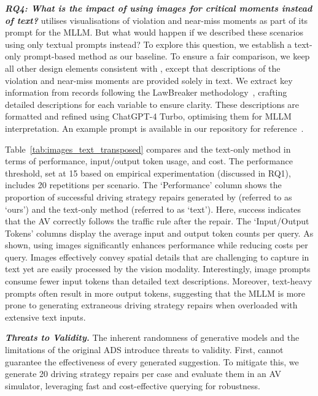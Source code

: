 \noindent \emph{\textbf {RQ4: What is the impact of using images for critical moments instead of text?}}
\coolname utilises visualisations of violation and near-miss moments as part of its prompt for the MLLM. 
But what would happen if we described these scenarios using only textual prompts instead? To explore this question, we establish a text-only prompt-based method as our baseline. 
To ensure a fair comparison, we keep all other design elements consistent with \coolname, except that descriptions of the violation and near-miss moments are provided solely in text. 
We extract key information from records following the LawBreaker methodology~\cite{Sun-Poskitt-et_al22a}, crafting detailed descriptions for each variable to ensure clarity. These descriptions are formatted and refined using ChatGPT-4 Turbo, optimising them for MLLM interpretation. An example prompt is available in our repository for reference~\cite{source_code}.


Table~\ref{tab:images_text_transposed} compares \coolname and the text-only method in terms of performance, input/output token usage, and cost. The performance threshold, set at 15 based on empirical experimentation (discussed in RQ1), includes 20 repetitions per scenario. The `Performance' column shows the proportion of successful driving strategy repairs generated by \coolname (referred to as `ours') and the text-only method (referred to as `text'). Here, success indicates that the AV correctly follows the traffic rule after the repair. The `Input/Output Tokens' columns display the average input and output token counts per query. As shown, using images significantly enhances performance while reducing costs per query. Images effectively convey spatial details that are challenging to capture in text yet are easily processed by the vision modality. 
Interestingly, image prompts consume fewer input tokens than detailed text descriptions. 
Moreover, text-heavy prompts often result in more output tokens, suggesting that the MLLM is more prone to generating extraneous driving strategy repairs when overloaded with extensive text inputs. 



\noindent \emph{\textbf {Threats to Validity. }}
The inherent randomness of generative models and the limitations of the original ADS introduce threats to validity. First, \coolname cannot guarantee the effectiveness of every generated suggestion. To mitigate this, we generate 20 driving strategy repairs per case and evaluate them in an AV simulator, leveraging fast and cost-effective querying for robustness.

